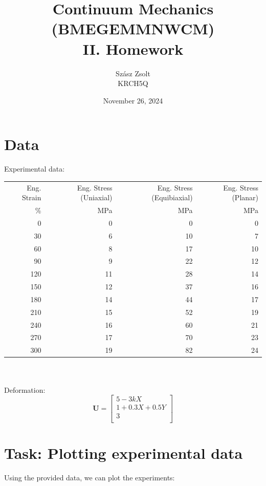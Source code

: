 \documentclass[12pt,a4paper]{article}
\title{Continuum Mechanics\\(BMEGEMMNWCM)\\II. Homework}
\author{Szász Zsolt\\KRCH5Q}
\date{November 26, 2024}
\begin{document}
\maketitle{}

\newpage
\tableofcontents

\newpage

\section*{Data}

Experimental data:\\

\begin{tabular}{rrrr}
    \toprule
    Eng. Strain  & Eng. Stress  (Uniaxial) & Eng. Stress  (Equibiaxial) & Eng. Stress  (Planar) \\
    \% & MPa & MPa & MPa \\
    \midrule
    0 & 0 & 0 & 0 \\
    30 & 6 & 10 & 7 \\
    60 & 8 & 17 & 10 \\
    90 & 9 & 22 & 12 \\
    120 & 11 & 28 & 14 \\
    150 & 12 & 37 & 16 \\
    180 & 14 & 44 & 17 \\
    210 & 15 & 52 & 19 \\
    240 & 16 & 60 & 21 \\
    270 & 17 & 70 & 23 \\
    300 & 19 & 82 & 24 \\
    \bottomrule
\end{tabular}
\\\\
Deformation:
$$
\boldsymbol{U} = 
\begin{bmatrix}
    5-3kX\\
    1+0.3X+0.5Y\\
    3\\
\end{bmatrix}
$$

\section{Task: Plotting experimental data}

Using the provided data, we can plot the experiments:
\end{document}
